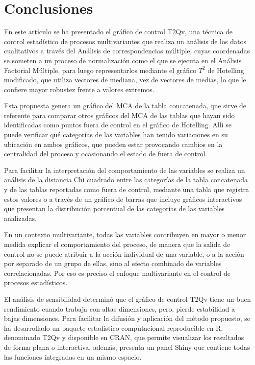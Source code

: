 \documentclass[mathematics,article,submit,moreauthors,pdftex]{mdpi}
\begin{document}
\hypertarget{conclusiones}{%
\section{Conclusiones}\label{conclusiones}}

En este artículo se ha presentado el gráfico de control T2Qv, una
técnica de control estadístico de procesos multivariantes que realiza un
análisis de los datos cualitativos a través del Análisis de
correspondencias múltiple, cuyas coordenadas se someten a un proceso de
normalización como el que se ejecuta en el Análisis Factorial Múltiple,
para luego representarlos mediante el gráfico \(T^2\) de Hotelling
modificado, que utiliza vectores de mediana, vez de vectores de medias,
lo que le confiere mayor robustez frente a valores extremos.

Esta propuesta genera un gráfico del MCA de la tabla concatenada, que
sirve de referente para comparar otros gráficos del MCA de las tablas
que hayan sido identificadas como puntos fuera de control en el gráfico
de Hotelling. Allí se puede verificar qué categorías de las variables
han tenido variaciones en su ubicación en ambos gráficos, que pueden
estar provocando cambios en la centralidad del proceso y ocasionando el
estado de fuera de control.

Para facilitar la interpretación del comportamiento de las variables se
realiza un análisis de la distancia Chi cuadrado entre las categorías de
la tabla concatenada y de las tablas reportadas como fuera de control,
mediante una tabla que registra estos valores o a través de un gráfico
de barras que incluye gráficos interactivos que presentan la
distribución porcentual de las categorías de las variables analizadas.

En un contexto multivariante, todas las variables contribuyen en mayor o
menor medida explicar el comportamiento del proceso, de manera que la
salida de control no se puede atribuir a la acción individual de una
variable, o a la acción por separado de un grupo de ellas, sino al
efecto combinado de variables correlacionadas. Por eso es preciso el
enfoque multivariante en el control de procesos estadísticos.

El análisis de sensibilidad determinó que el gráfico de control T2Qv
tiene un buen rendimiento cuando trabaja con altas dimensiones, pero,
pierde estabilidad a bajas dimensiones. Para facilitar la difusión y
aplicación del método propuesto, se ha desarrollado un paquete
estadístico computacional reproducible en R, denominado T2Qv y
disponible en CRAN, que permite visualizar los resultados de forma plana
o interactiva, además, presenta un panel Shiny que contiene todas las
funciones integradas en un mismo espacio.
\end{document}
